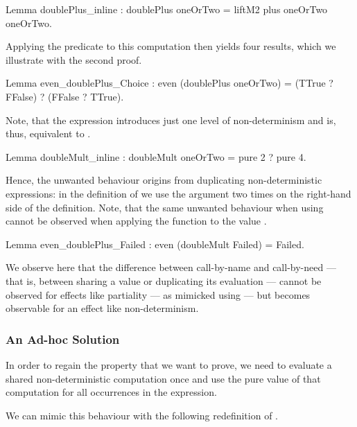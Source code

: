 \begin{coqcode}
Lemma doublePlus_inline :
  doublePlus oneOrTwo = liftM2 plus oneOrTwo oneOrTwo.
\end{coqcode}

\noindent Applying the predicate  to this computation then yields four results, which we illustrate with the second proof.

\begin{coqcode}
Lemma even_doublePlus_Choice :
  even (doublePlus oneOrTwo) = (TTrue ? FFalse) ? (FFalse ? TTrue).
\end{coqcode}

Note, that the expression  introduces just one level of non\--determinism and is, thus, equivalent to .

\begin{coqcode}
Lemma doubleMult_inline :
  doubleMult oneOrTwo = pure 2 ? pure 4.
\end{coqcode}

Hence, the unwanted behaviour origins from duplicating non\--deterministic expressions: in the definition of  we use the argument  two times on the right\--hand side of the definition.
Note, that the same unwanted behaviour when using  cannot be observed when applying the function to the value .

\begin{coqcode}
Lemma even_doublePlus_Failed :
  even (doubleMult Failed) = Failed.
\end{coqcode}

We observe here that the difference between call\--by\--name and call\--by\--need --- that is, between sharing a value or duplicating its evaluation --- cannot be observed for effects like partiality --- as mimicked using  --- but becomes observable for an effect like non\--determinism.

\subsubsection{An Ad\--hoc Solution}
\label{subsubsec:adhoc}

In order to regain the property that we want to prove, we need to evaluate a shared non\--deterministic computation once and use the pure value of that computation for all occurrences in the expression.

We can mimic this behaviour with the following redefinition of .

